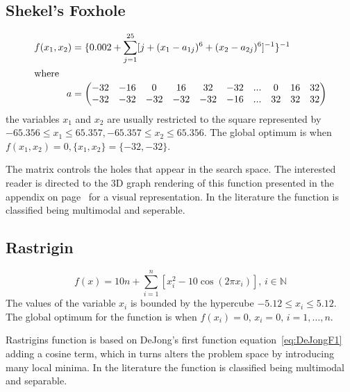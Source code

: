 \subsection{Shekel's Foxhole}
\begin{align}
\label{eq:shekel}
	f(x_1,x_2) &= \{0.002 + \sum^{25}_{j=1} [j + (x_1 - a_{1j})^6 + (x_2 - a_{2j})^6]^{-1}\}^{-1}\\
\intertext{where}
	a &= \begin{pmatrix} \nonumber
			-32 & -16 & 0 & 16 & 32 & -32 & ... & 0 & 16 & 32 \\
			-32 & -32 & -32 & -32 & -32 & -16 & ... & 32 & 32 & 32 \\
		 \end{pmatrix}
\end{align}
the variables $x_1$ and $x_2$ are usually restricted to the square represented by $-65.356 \leq x_1 \leq 65.357, -65.357 \leq x_2 \leq 65.356$\cite{ABCCompareStudy,TSGlobalOptimization,ContinACSTS,TestFunctions}. The global optimum is when $f(x_1,x_2) = 0, \{x_1,x_2\} = \{-32,-32\}$\cite{ABCCompareStudy,TSGlobalOptimization,ContinACSTS,TestFunctions}.

The matrix controls the holes that appear in the search space. The interested reader is directed to the 3D graph rendering of this function presented in the appendix on page~\pageref{fig:ShekelGraph} for a visual representation. In the literature the function is classified being multimodal and seperable\cite{adaptPSO,ABCCompareStudy,TestFunctions}.
\subsection{Rastrigin}
\begin{equation}
	f(x) = 10n + \sum_{i=1}^n [x_i^2 - 10\cos(2 \pi x_i)],\, i \in \mathbb{N}
\end{equation}
The values of the variable $x_i$ is bounded by the hypercube $-5.12 \leq x_i \leq 5.12$\cite{adaptPSO,ABCCompareStudy,numericalABC,ARPSO,PerfABC,HybridIntelliGA,TestFunctions}. The global optimum for the function is when $f(x_i) = 0,\, x_i = 0, \, i = 1,\dots,n$\cite{adaptPSO,ABCCompareStudy,numericalABC,HybridIntelliGA,TestFunctions}.

Rastrigins function is based on DeJong's first function equation~\ref{eq:DeJongF1} adding a cosine term, which in turns alters the problem space by introducing many local minima\cite{numericalABC,PerfABC,HybridIntelliGA,TestFunctions}. In the literature the function is classified being multimodal and separable\cite{adaptPSO,ABCCompareStudy,numericalABC,ARPSO,ChaoticABC,PerfABC,HybridIntelliGA,TestFunctions}.
